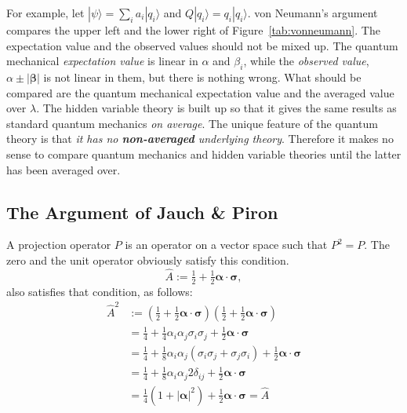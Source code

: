 \documentclass[12pt]{article}
\begin{document}
For example, let $|\psi\rangle=\sum_{i}a_i|q_i\rangle$ and $Q|q_i\rangle = q_i |q_i\rangle$.  von Neumann's argument compares the upper left and the lower right of Figure~\ref{tab:vonneumann}. The expectation value and the observed values should not be mixed up. The quantum mechanical {\it expectation value} is linear in $\alpha$ and $\beta_i$, while the {\it observed value}, $\alpha \pm |\bm{\beta}|$ is not linear in them, but there is nothing wrong. What should be compared are the quantum mechanical expectation value and the averaged value over $\lambda$. The hidden variable theory is built up so that it gives the same results as standard quantum mechanics \emph{on average}.  The unique feature of the quantum theory is that \emph{it has no \textbf{non-averaged} underlying theory}.  Therefore it makes no sense to compare quantum mechanics and hidden variable theories until the latter has been averaged over.


\subsection{The Argument of Jauch \& Piron}

A projection operator $P$ is an operator on a vector space such that
$P^2 = P$. The zero and the unit operator obviously satisfy this
condition.
\begin{displaymath}
  \hat{A}:= \tfrac{1}{2}+\tfrac{1}{2}\bm{\alpha}\cdot\bm{\sigma},
\end{displaymath}
also satisfies that condition, as follows:
\begin{align*}
  \hat{A}^2&:= \left(\tfrac{1}{2}+\tfrac{1}{2}\bm{\alpha}\cdot\bm{\sigma}\right)\left(\tfrac{1}{2}+\tfrac{1}{2}\bm{\alpha}\cdot\bm{\sigma}\right)\\
  &=\tfrac{1}{4}+\tfrac{1}{4}\alpha_i\alpha_j\sigma_i\sigma_j+\tfrac{1}{2}\bm{\alpha}\cdot\bm{\sigma}\\
  &=\tfrac{1}{4}+\tfrac{1}{8}\alpha_i\alpha_j(\sigma_i\sigma_j+\sigma_j\sigma_i)+\tfrac{1}{2}\bm{\alpha}\cdot\bm{\sigma}\\
  &=\tfrac{1}{4}+\tfrac{1}{8}\alpha_i\alpha_j2\delta_{ij}+\tfrac{1}{2}\bm{\alpha}\cdot\bm{\sigma}\\
  &=\tfrac{1}{4}(1+|\bm{\alpha}|^2)+\tfrac{1}{2}\bm{\alpha}\cdot\bm{\sigma}=\hat{A}
\end{align*}
\end{document}

